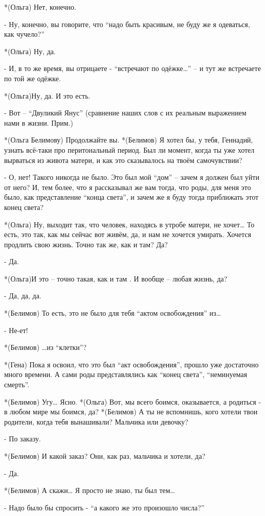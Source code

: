 *(Ольга) Нет, конечно.

- Ну, конечно, вы говорите, что “надо быть красивым, не буду же я одеваться, как чучело?”

*(Ольга) Ну, да.

- И, в то же время, вы отрицаете - “встречают по одёжке…” – и тут же встречаете по той же одёжке.

*(Ольга)Ну, да. И это есть.

- Вот – “Двуликий Янус” (сравнение наших слов с их реальным выражением нами в жизни. Прим.)

*(Ольга Белимову) Продолжайте вы.
*(Белимов) Я хотел бы, у тебя, Геннадий, узнать всё-таки про перитональный период. Был ли момент, когда ты уже хотел вырваться из живота матери, и как это сказывалось на твоём самочувствии?

- О, нет! Такого никогда не было. Это был мой “дом” – зачем я должен был уйти от него? И, тем более, что я рассказывал же вам тогда, что роды, для меня это было, как представление “конца света”, и зачем же я буду тогда приближать этот конец света?

*(Ольга) Ну, выходит так, что человек, находясь в утробе матери, не хочет… То есть, это так, как мы сейчас вот живём, да, и нам не хочется умирать. Хочется продлить свою жизнь. Точно так же, как и там? Да?

- Да.

*(Ольга)И это – точно такая, как и там . И вообще – любая жизнь, да?

- Да, да, да.

*(Белимов) То есть, это не было для тебя “актом освобождения” из…

- Не-ет!

*(Белимов) …из “клетки”?

*(Гена) Пока я освоил, что это был “акт освобождения”, прошло уже достаточно много времени. А сами роды представлялись как “конец света”, “неминуемая смерть”.

*(Белимов) Угу… Ясно.
*(Ольга) Вот, мы всего боимся, оказывается, а родиться - в любом мире мы боимся, да?
*(Белимов) А ты не вспомнишь, кого хотели твои родители, когда тебя вынашивали?  Мальчика или девочку?

- По заказу.

*(Белимов) И какой заказ? Они, как раз, мальчика и хотели, да?

- Да.

*(Белимов) А скажи… Я просто не знаю, ты был тем…

- Надо было бы спросить - “а какого же это произошло числа?”

